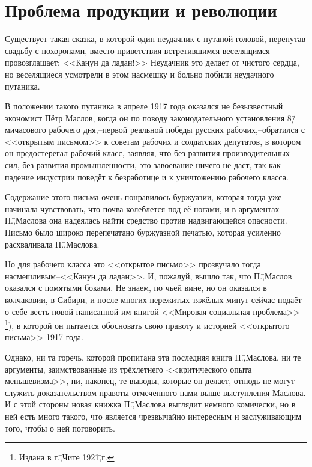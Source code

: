 \newpage
\section*{Проблема продукции и революции}
\label{sec:6}

Существует такая сказка, в которой один неудачник с путаной головой, перепутав свадьбу с похоронами, вместо приветствия встретившимся веселящимся провозглашает: <<Канун да ладан!>> Неудачник это делает от чистого сердца, но веселящиеся усмотрели в этом насмешку и больно побили неудачного путаника.

В положении такого путаника в апреле 1917 года оказался не безызвестный экономист Пётр Маслов, когда он по поводу законодательного установления 8\=/мичасового рабочего дня,\---первой реальной победы русских рабочих,\---обратился с <<открытым письмом>> к советам рабочих и солдатских депутатов, в котором он предостерегал рабочий класс, заявляя, что без развития производительных сил, без развития промышленности, это завоевание ничего не даст, так как падение индустрии поведёт к безработице и к уничтожению рабочего класса.

Содержание этого письма очень понравилось буржуазии, которая тогда уже начинала чувствовать, что почва колеблется под её ногами, и в аргументах П.\=,Маслова она надеялась найти средство против надвигающейся опасности. Письмо было широко перепечатано буржуазной печатью, которая усиленно расхваливала П.\=,Маслова.

Но для рабочего класса это <<открытое письмо>> прозвучало тогда насмешливым\---<<Канун да ладан>>. И, пожалуй, вышло так, что П.\=,Маслов оказался с помятыми боками. Не знаем, по чьей вине, но он оказался в колчаковии, в Сибири, и после многих пережитых тяжёлых минут сейчас подаёт о себе весть новой написанной им книгой <<Мировая социальная проблема>> \footnote{Издана в г.\=,Чите 1921\=,г.}), в которой он пытается обосновать свою правоту и историей <<открытого письма>> 1917 года.

Однако, ни та горечь, которой пропитана эта последняя книга П.\=,Маслова, ни те аргументы, заимствованные из трёхлетнего <<критического опыта меньшевизма>>, ни, наконец, те выводы, которые он делает, отнюдь не могут служить доказательством правоты отмеченного нами выше выступления Маслова. И с этой стороны новая книжка П.\=,Маслова выглядит немного комически, но в ней есть много такого, что является чрезвычайно интересным и заслуживающим того, чтобы о ней поговорить.

